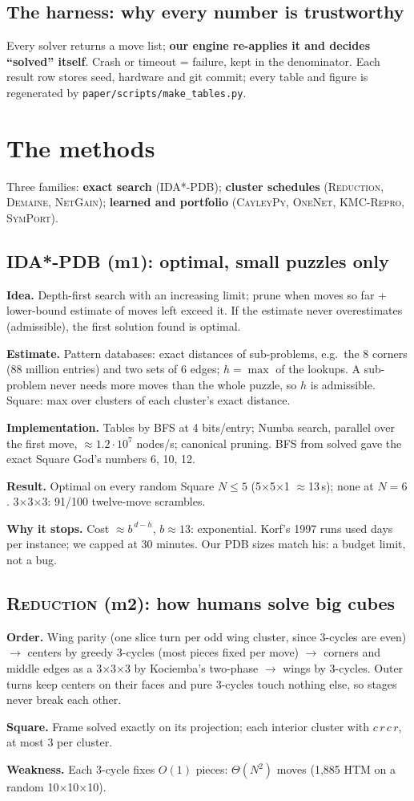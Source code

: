 \documentclass[10.5pt,a4paper]{article}
\newcommand{\Cu}[1]{#1$\times$#1$\times$#1}
\newcommand{\Sq}[1]{#1$\times$#1$\times$1}
\newcommand{\M}[1]{\textsc{#1}}
\newcommand{\sub}[1]{\par\smallskip\textbf{#1}\quad}
\begin{document}
\subsection{The harness: why every number is trustworthy}
Every solver returns a move list; \textbf{our engine re-applies it and decides ``solved'' itself}. Crash or timeout = failure,
kept in the denominator. Each result row stores seed, hardware and git commit; every table and figure is regenerated by
\texttt{paper/scripts/make\_tables.py}.

\section{The methods}
Three families: \textbf{exact search} (\M{IDA*-PDB}); \textbf{cluster schedules} (\M{Reduction}, \M{Demaine}, \M{NetGain});
\textbf{learned and portfolio} (\M{CayleyPy}, \M{OneNet}, \M{KMC-Repro}, \M{SymPort}).

\subsection{\M{IDA*-PDB} (m1): optimal, small puzzles only}
\sub{Idea.} Depth-first search with an increasing limit; prune when moves so far + lower-bound estimate of moves left exceed it.
If the estimate never overestimates (admissible), the first solution found is optimal.
\sub{Estimate.} Pattern databases: exact distances of sub-problems, e.g.\ the 8 corners (88 million entries) and two sets of 6
edges; $h=\max$ of the lookups. A sub-problem never needs more moves than the whole puzzle, so $h$ is admissible. Square: max
over clusters of each cluster's exact distance.
\sub{Implementation.} Tables by BFS at 4 bits/entry; Numba search, parallel over the first move, $\approx1.2\cdot10^7$ nodes/s;
canonical pruning. BFS from solved gave the exact Square God's numbers 6, 10, 12.
\sub{Result.} Optimal on every random Square $N\le5$ (\Sq{5} $\approx$13\,s); none at $N=6$. \Cu{3}: 91/100 twelve-move scrambles.
\sub{Why it stops.} Cost $\approx b^{\,d-h}$, $b\approx13$: exponential. Korf's 1997 runs used days per instance; we capped at
30 minutes. Our PDB sizes match his: a budget limit, not a bug.

\subsection{\M{Reduction} (m2): how humans solve big cubes}
\sub{Order.} Wing parity (one slice turn per odd wing cluster, since 3-cycles are even) $\to$ centers by greedy 3-cycles (most
pieces fixed per move) $\to$ corners and middle edges as a \Cu{3} by Kociemba's two-phase $\to$ wings by 3-cycles. Outer turns
keep centers on their faces and pure 3-cycles touch nothing else, so stages never break each other.
\sub{Square.} Frame solved exactly on its projection; each interior cluster with $c\,r\,c\,r$, at most 3 per cluster.
\sub{Weakness.} Each 3-cycle fixes $O(1)$ pieces: $\Theta(N^2)$ moves (1,885 HTM on a random \Cu{10}).
\end{document}
